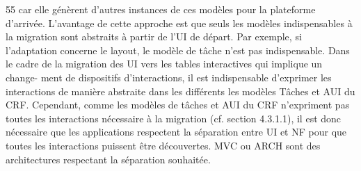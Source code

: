 \documentclass{article}
\begin{document}
55
car elle génèrent d’autres instances de ces modèles pour la plateforme d’arrivée.
L’avantage de cette approche est que seuls les modèles indispensables à la migration sont abstraits
à partir de l’UI de départ. Par exemple, si l’adaptation concerne le layout, le modèle de tâche n’est pas
indispensable. Dans le cadre de la migration des UI vers les tables interactives qui implique un change-
ment de dispositifs d’interactions, il est indispensable d’exprimer les interactions de manière abstraite
dans les différents les modèles Tâches et AUI du CRF. Cependant, comme les modèles de tâches et
AUI du CRF n’expriment pas toutes les interactions nécessaire à la migration (cf. section 4.3.1.1), il
est donc nécessaire que les applications respectent la séparation entre UI et NF pour que toutes les
interactions puissent être découvertes. MVC ou ARCH sont des architectures respectant la séparation
souhaitée.
 
\end{document}
